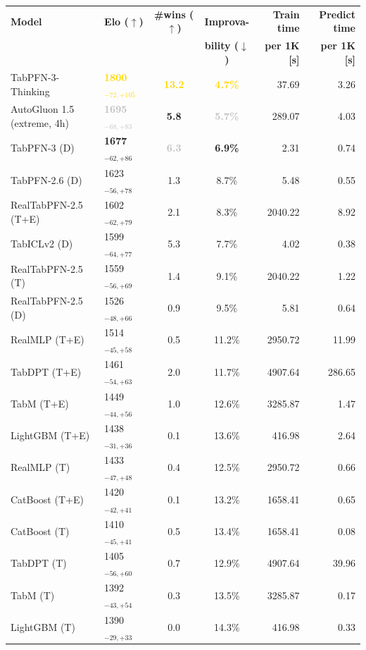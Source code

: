 \begin{tabular}{llccrr}
\toprule
\textbf{Model} & \textbf{Elo ($\uparrow$)} & \textbf{\#wins ($\uparrow$)} & \textbf{Improva-} & \textbf{Train time} & \textbf{Predict time} \\
 &  &  & \textbf{bility ($\downarrow$)} & \textbf{per 1K [s]} & \textbf{per 1K [s]} \\
\midrule
TabPFN-3-Thinking & \textcolor{gold}{\textbf{1800${}_{-72,+105}$}} & \textcolor{gold}{\textbf{13.2}} & \textcolor{gold}{\textbf{4.7\%}} & 37.69 & 3.26 \\
AutoGluon 1.5 (extreme, 4h) & \textcolor{silver}{\textbf{1695${}_{-68,+83}$}} & \textcolor{bronze}{\textbf{5.8}} & \textcolor{silver}{\textbf{5.7\%}} & 289.07 & 4.03 \\
TabPFN-3 (D) & \textcolor{bronze}{\textbf{1677${}_{-62,+86}$}} & \textcolor{silver}{\textbf{6.3}} & \textcolor{bronze}{\textbf{6.9\%}} & 2.31 & 0.74 \\
TabPFN-2.6 (D) & 1623${}_{-56,+78}$ & 1.3 & 8.7\% & 5.48 & 0.55 \\
RealTabPFN-2.5 (T+E) & 1602${}_{-62,+79}$ & 2.1 & 8.3\% & 2040.22 & 8.92 \\
TabICLv2 (D) & 1599${}_{-64,+77}$ & 5.3 & 7.7\% & 4.02 & 0.38 \\
RealTabPFN-2.5 (T) & 1559${}_{-56,+69}$ & 1.4 & 9.1\% & 2040.22 & 1.22 \\
RealTabPFN-2.5 (D) & 1526${}_{-48,+66}$ & 0.9 & 9.5\% & 5.81 & 0.64 \\
RealMLP (T+E) & 1514${}_{-45,+58}$ & 0.5 & 11.2\% & 2950.72 & 11.99 \\
TabDPT (T+E) & 1461${}_{-54,+63}$ & 2.0 & 11.7\% & 4907.64 & 286.65 \\
TabM (T+E) & 1449${}_{-44,+56}$ & 1.0 & 12.6\% & 3285.87 & 1.47 \\
LightGBM (T+E) & 1438${}_{-31,+36}$ & 0.1 & 13.6\% & 416.98 & 2.64 \\
RealMLP (T) & 1433${}_{-47,+48}$ & 0.4 & 12.5\% & 2950.72 & 0.66 \\
CatBoost (T+E) & 1420${}_{-42,+41}$ & 0.1 & 13.2\% & 1658.41 & 0.65 \\
CatBoost (T) & 1410${}_{-45,+41}$ & 0.5 & 13.4\% & 1658.41 & 0.08 \\
TabDPT (T) & 1405${}_{-56,+60}$ & 0.7 & 12.9\% & 4907.64 & 39.96 \\
TabM (T) & 1392${}_{-43,+54}$ & 0.3 & 13.5\% & 3285.87 & 0.17 \\
LightGBM (T) & 1390${}_{-29,+33}$ & 0.0 & 14.3\% & 416.98 & 0.33 \\

\end{tabular}
